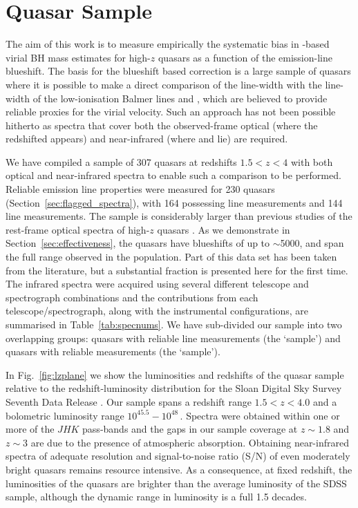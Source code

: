 \section{Quasar Sample}

The aim of this work is to measure empirically the systematic bias in -based virial BH mass estimates for high-$z$ quasars as a function of the  emission-line blueshift. 
The basis for the  blueshift based correction is a large sample of quasars where it is possible to make a direct comparison of the  line-width with the line-width of the low-ionisation Balmer lines \ha and \hbns, which are believed to provide reliable proxies for the virial velocity. 
Such an approach has not been possible hitherto as spectra that cover both the observed-frame optical (where the redshifted  appears) and near-infrared (where \hb and \ha lie) are required.

We have compiled a sample of 307 quasars at redshifts $1.5 < z < 4$ with both optical and near-infrared spectra to enable such a comparison to be performed. 
Reliable emission line properties were measured for 230 quasars (Section~\ref{sec:flagged_spectra}), with 164 possessing \ha line measurements and 144 \hb line measurements.  
The sample is considerably larger than previous studies of the rest-frame optical spectra of high-$z$ quasars \citep[e.g.][]{shen12}. 
As we demonstrate in Section~\ref{sec:effectiveness}, the quasars have  blueshifts of up to $\sim$5000\kms, and span the full range observed in the population. 
Part of this data set has been taken from the literature, but a substantial fraction is presented here for the first time. 
The infrared spectra were acquired using several different telescope and spectrograph combinations and the contributions from each telescope/spectrograph, along with the instrumental configurations, are summarised in Table~\ref{tab:specnums}. 
We have sub-divided our sample into two overlapping groups: quasars with reliable \ha line measurements (the `\ha sample') and quasars with reliable \hb measurements (the `\hb sample').

In Fig.~\ref{fig:lzplane} we show the luminosities and redshifts of the quasar sample relative to the redshift-luminosity distribution for the Sloan Digital Sky Survey \citep[SDSS;][]{york00} Seventh Data Release \citep[DR7;][]{schneider10}.
Our sample spans a redshift range $1.5 < z < 4.0$ and a bolometric luminosity range $10^{45.5}-10^{48}$\,\ergs. 
Spectra were obtained within one or more of the $JHK$ pass-bands and the gaps in our sample coverage at $z\sim1.8$ and $z\sim3$ are due to the presence of atmospheric absorption. 
Obtaining near-infrared spectra of adequate resolution and signal-to-noise ratio (S/N) of even moderately bright quasars remains resource intensive. 
As a consequence, at fixed redshift, the luminosities of the quasars are brighter than the average luminosity of the SDSS sample, although the dynamic range in luminosity is a full 1.5 decades.


